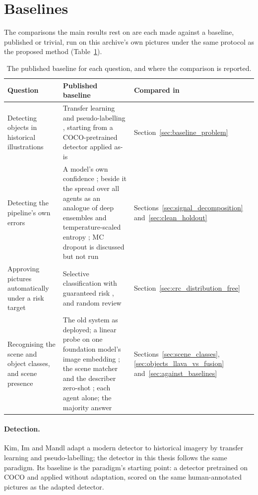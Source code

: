 \documentclass[12pt,a4paper]{report}
\begin{document}
\section{Baselines}
\label{sec:baselines}

The comparisons the main results rest on are each made against a baseline, published or trivial, run on this
archive's own pictures under the same protocol as the proposed method (Table~\ref{tab:baselines}).

\begin{table}[!htbp]
\centering
\small
\caption[The published baseline for each question]{The published baseline for each question, and where the comparison is reported.}
\label{tab:baselines}
\begin{tabular}{>{\raggedright\arraybackslash}p{3.6cm}>{\raggedright\arraybackslash}p{6.4cm}>{\raggedright\arraybackslash}p{3.6cm}}
\toprule
Question & Published baseline & Compared in \\
\midrule
Detecting objects in historical illustrations & Transfer learning and pseudo-labelling \cite{kim2024historical_od}, starting from a COCO-pretrained detector \cite{coco2014} applied as-is & Section~\ref{sec:baseline_problem} \\
\addlinespace
Detecting the pipeline's own errors & A model's own confidence \cite{hendrycks2017baseline}; beside it the spread over all agents as an analogue of deep ensembles \cite{deepensembles2017} and temperature-scaled entropy \cite{guo2017calibration}; MC dropout \cite{gal2016dropout} is discussed but not run & Sections~\ref{sec:signal_decomposition} and~\ref{sec:clean_holdout} \\
\addlinespace
Approving pictures automatically under a risk target & Selective classification with guaranteed risk \cite{geifman2017selective}, and random review & Section~\ref{sec:crc_distribution_free} \\
\addlinespace
Recognising the scene and object classes, and scene presence & The old system as deployed; a linear probe on one foundation model's image embedding \cite{clip2021}; the scene matcher and the describer zero-shot \cite{siglip2023}; each agent alone; the majority answer & Sections~\ref{sec:scene_classes}, \ref{sec:objects_llava_vs_fusion} and~\ref{sec:against_baselines} \\
\bottomrule
\end{tabular}
\end{table}

\paragraph{Detection.} Kim, Im and Mandl \cite{kim2024historical_od} adapt a modern detector to
historical imagery by transfer learning and pseudo-labelling; the detector in this thesis follows the
same paradigm. Its baseline is the paradigm's starting point: a detector pretrained on COCO and applied
without adaptation, scored on the same human-annotated pictures as the adapted detector.
\end{document}
